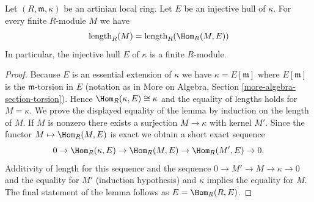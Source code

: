 \begin{lemma}
\label{lemma-finite}
Let $(R, \mathfrak m, \kappa)$ be an artinian local ring.
Let $E$ be an injective hull of $\kappa$. For every finite
$R$-module $M$ we have
$$
\text{length}_R(M) = \text{length}_R(\Hom_R(M, E))
$$
In particular, the injective hull $E$ of $\kappa$ is a finite $R$-module.
\end{lemma}

\begin{proof}
Because $E$ is an essential extension of $\kappa$ we have
$\kappa = E[\mathfrak m]$ where $E[\mathfrak m]$ is the
$\mathfrak m$-torsion in $E$ (notation as in More on Algebra, Section
\ref{more-algebra-section-torsion}).
Hence $\Hom_R(\kappa, E) \cong \kappa$ and the equality of lengths
holds for $M = \kappa$. We prove the displayed equality of the lemma
by induction on the length of $M$. If $M$ is nonzero there exists a surjection
$M \to \kappa$ with kernel $M'$. Since the functor $M \mapsto \Hom_R(M, E)$
is exact we obtain a short exact sequence
$$
0 \to \Hom_R(\kappa, E) \to \Hom_R(M, E) \to \Hom_R(M', E) \to 0.
$$
Additivity of length for this sequence and the sequence
$0 \to M' \to M \to \kappa \to 0$ and the equality for $M'$ (induction
hypothesis) and $\kappa$ implies the equality for $M$.
The final statement of the lemma follows as $E = \Hom_R(R, E)$.
\end{proof}
